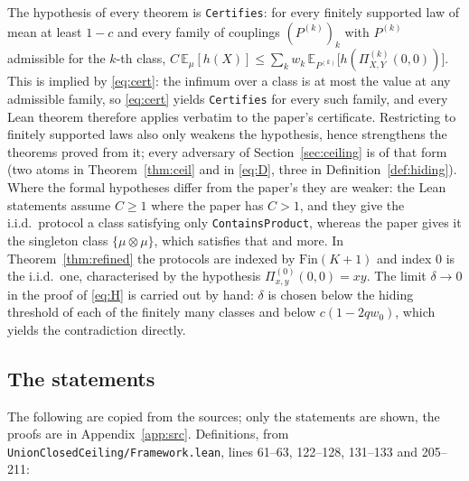 \documentclass[11pt,a4paper]{article}
\theoremstyle{definition}
\theoremstyle{remark}
\newcommand{\E}{\mathbb{E}}
\newcommand{\ent}{h}
\begin{document}
The hypothesis of every theorem is \texttt{Certifies}: for every finitely supported law of
mean at least $1-c$ and every family of couplings $(P^{(k)})_k$ with $P^{(k)}$ admissible for
the $k$-th class,
$C\,\E_\mu[\ent(X)]\le\sum_kw_k\,\E_{P^{(k)}}\big[\ent(\Pi^{(k)}_{X,Y}(0,0))\big]$.
This is implied by \eqref{eq:cert}: the infimum over a class is at most the value at any
admissible family, so \eqref{eq:cert} yields \texttt{Certifies} for every such family, and
every Lean theorem therefore applies verbatim to the paper's certificate. Restricting to
finitely supported laws also only weakens the hypothesis, hence strengthens the theorems
proved from it; every adversary of Section~\ref{sec:ceiling} is of that form (two atoms in
Theorem~\ref{thm:ceil} and in \eqref{eq:D}, three in Definition~\ref{def:hiding}). Where the
formal hypotheses differ from the paper's they are weaker: the Lean statements assume
$C\ge1$ where the paper has $C>1$, and they give the i.i.d.\ protocol a class satisfying
only \texttt{ContainsProduct}, whereas the paper gives it the singleton class
$\{\mu\otimes\mu\}$, which satisfies that and more. In Theorem~\ref{thm:refined} the
protocols are indexed by $\mathrm{Fin}(K+1)$ and index $0$ is the i.i.d.\ one, characterised
by the hypothesis $\Pi^{(0)}_{x,y}(0,0)=xy$. The limit $\delta\to0$ in the proof of
\eqref{eq:H} is carried out by hand: $\delta$ is chosen below the hiding threshold of each of
the finitely many classes and below $c(1-2qw_0)$, which yields the contradiction directly.

\subsection{The statements}\label{app:lean:stmts}
The following are copied from the sources; only the statements are shown, the proofs are in
Appendix~\ref{app:src}. Definitions, from \texttt{UnionClosedCeiling/\allowbreak Framework.lean}, lines
61--63, 122--128, 131--133 and 205--211:
\end{document}
